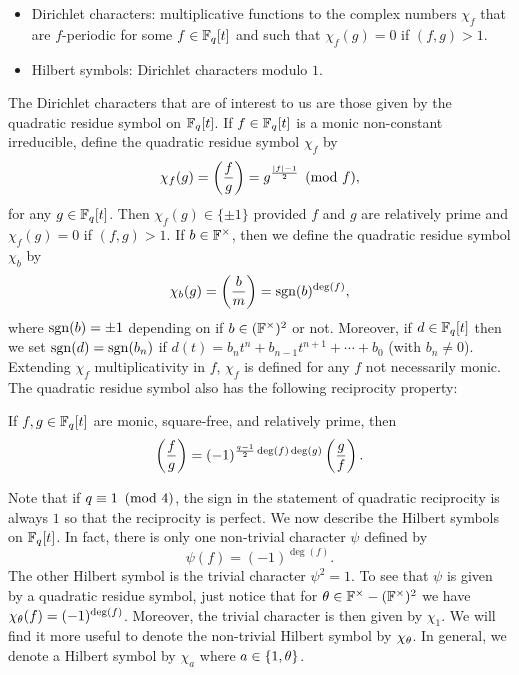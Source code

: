 \documentclass[12pt,reqno,oneside]{amsart}
\begin{document}
    \begin{itemize}
        \item Dirichlet characters: multiplicative functions to the complex numbers $\chi_{f}$ that are $f$-periodic for some $f \in \mathbb{F}_{q}[t]$ and such that $\chi_{f}(g) = 0$ if $(f,g) > 1$.
        \item Hilbert symbols: Dirichlet characters modulo $1$.
    \end{itemize}
    
    The Dirichlet characters that are of interest to us are those given by the quadratic residue symbol on $\mathbb{F}_{q}[t]$. If $f \in \mathbb{F}_{q}[t]$ is a monic non-constant irreducible, define the quadratic residue symbol $\chi_{f}$ by
    \[
        \chi_{f}(g) = \left(\frac{f}{g}\right) = g^{\frac{|f|-1}{2}} \pmod{f},
    \]
    for any $g \in \mathbb{F}_{q}[t]$. Then $\chi_{f}(g) \in \{\pm 1\}$ provided $f$ and $g$ are relatively prime and $\chi_{f}(g) = 0$ if $(f,g) > 1$. If $b \in \mathbb{F}^{\times}$, then we define the quadratic residue symbol $\chi_{b}$ by
    \[
        \chi_{b}(g) = \left(\frac{b}{m}\right) = \operatorname{\mathrm{sgn}}(b)^{\deg(f)},
    \]
    where $\operatorname{\mathrm{sgn}}(b) = \pm1$ depending on if $b \in (\mathbb{F}^{\times})^{2}$ or not. Moreover, if $d \in \mathbb{F}_{q}[t]$ then we set $\operatorname{\mathrm{sgn}}(d) = \operatorname{\mathrm{sgn}}(b_{n})$ if $d(t) = b_{n}t^{n}+b_{n-1}t^{n+1}+\cdots+b_{0}$ (with $b_{n} \neq 0$). Extending $\chi_{f}$ multiplicativity in $f$, $\chi_{f}$ is defined for any $f$ not necessarily monic. The quadratic residue symbol also has the following reciprocity property:

    \begin{theorem}
        If $f,g \in \mathbb{F}_{q}[t]$ are monic, square-free, and relatively prime, then
        \[
            \left(\frac{f}{g}\right) = (-1)^{\frac{q-1}{2}\deg(f)\deg(g)}\left(\frac{g}{f}\right).
        \]
    \end{theorem}

    Note that if $q \equiv 1 \ \left(\text{mod }4\right)$, the sign in the statement of quadratic reciprocity is always $1$ so that the reciprocity is perfect. We now describe the Hilbert symbols on $\mathbb{F}_{q}[t]$. In fact, there is only one non-trivial character $\psi$ defined by
    \[
        \psi(f) = (-1)^{\deg(f)}.
    \]
    The other Hilbert symbol is the trivial character $\psi^{2} = 1$. To see that $\psi$ is given by a quadratic residue symbol, just notice that for $\theta \in \mathbb{F}^{\times}-(\mathbb{F}^{\times})^{2}$ we have $\chi_{\theta}(f) = (-1)^{\deg(f)}$. Moreover, the trivial character is then given by $\chi_{1}$. We will find it more useful to denote the non-trivial Hilbert symbol by $\chi_{\theta}$. In general, we denote a Hilbert symbol by $\chi_{a}$ where $a \in \{1,\theta\}$.
\end{document}
